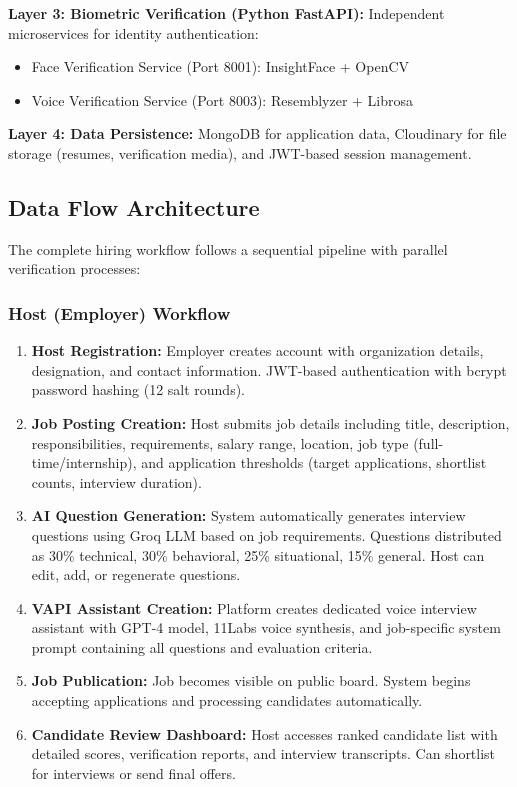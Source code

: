 \documentclass[conference]{IEEEtran}
\begin{document}
\textbf{Layer 3: Biometric Verification (Python FastAPI):} Independent microservices for identity authentication:
\begin{itemize}
    \item Face Verification Service (Port 8001): InsightFace + OpenCV
    \item Voice Verification Service (Port 8003): Resemblyzer + Librosa
\end{itemize}

\textbf{Layer 4: Data Persistence:} MongoDB for application data, Cloudinary for file storage (resumes, verification media), and JWT-based session management.

\subsection{Data Flow Architecture}

The complete hiring workflow follows a sequential pipeline with parallel verification processes:

\subsubsection{Host (Employer) Workflow}

\begin{enumerate}
    \item \textbf{Host Registration:} Employer creates account with organization details, designation, and contact information. JWT-based authentication with bcrypt password hashing (12 salt rounds).
    
    \item \textbf{Job Posting Creation:} Host submits job details including title, description, responsibilities, requirements, salary range, location, job type (full-time/internship), and application thresholds (target applications, shortlist counts, interview duration).
    
    \item \textbf{AI Question Generation:} System automatically generates interview questions using Groq LLM based on job requirements. Questions distributed as 30\% technical, 30\% behavioral, 25\% situational, 15\% general. Host can edit, add, or regenerate questions.
    
    \item \textbf{VAPI Assistant Creation:} Platform creates dedicated voice interview assistant with GPT-4 model, 11Labs voice synthesis, and job-specific system prompt containing all questions and evaluation criteria.
    
    \item \textbf{Job Publication:} Job becomes visible on public board. System begins accepting applications and processing candidates automatically.
    
    \item \textbf{Candidate Review Dashboard:} Host accesses ranked candidate list with detailed scores, verification reports, and interview transcripts. Can shortlist for interviews or send final offers.
\end{enumerate}
\end{document}
